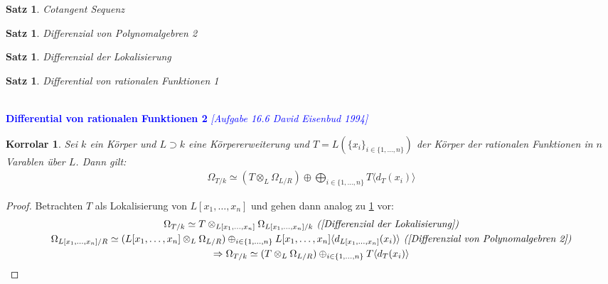 \documentclass[10pt,a4paper]{report}
\newcommand{\ModulsOfDifferenzials}{David Eisenbud 1994}
\newcounter{Aussage}[chapter]
\newtheorem{satz}[Aussage]{Satz}
\newtheorem{korrolar}[Aussage]{Korrolar}
\newcommand{\divR}[2]{\Omega_{#1/#2}}
\newcommand{\divf}[1]{d_{#1}}
\newcommand{\Tensor}[3]{#1 \otimes_{#2} #3}
\newcommand{\Verz}[1]{\langle #1 \rangle}
\begin{document}
\begin{satz}\label{Cotangent Sequenz}
Cotangent Sequenz
\end{satz}

\begin{satz}\label{Differenzial von Polynomalgebren 2}
Differenzial von Polynomalgebren 2
\end{satz}

\begin{satz}\label{Differenzial der Lokalisierung}
Differenzial der Lokalisierung
\end{satz}

\begin{satz}\label{Differential von rationalen Funktionen 1}
Differential von rationalen Funktionen 1
\end{satz}


\ \\
\textcolor{blue}{\textbf{Differential von rationalen Funktionen 2} \textit{[Aufgabe 16.6 \ModulsOfDifferenzials]}}
\begin{korrolar}\label{Differential von rationalen Funktionen 2}
Sei $k$ ein Körper und $L \supset k$ eine Körpererweiterung und $T = L(\lbrace x_i \rbrace_{i \in \lbrace 1,\dots,n \rbrace})$ der Körper der rationalen Funktionen in $n$ Varablen über $L$. Dann gilt:
\begin{gather*}
\divR{T}{k} \simeq (\Tensor{T}{L}{\divR{L}{R}}) \oplus \bigoplus_{i \in \lbrace 1,\dots,n \rbrace} T \Verz{\divf{T}(x_i)}
\end{gather*}
\end{korrolar}
\begin{proof}
Betrachten $T$ als Lokalisierung von $L[x_1,\dots,x_n]$ und gehen dann analog zu \cref{Differential von rationalen Funktionen 1} vor:
\begin{gather*}
\divR{T}{k} \simeq \Tensor{T}{L[x_1,\dots,x_n]}{\divR{L[x_1,\dots,x_n]}{k}} \textit{ (\cref{Differenzial der Lokalisierung})} \\
\divR{L[x_1,\dots,x_n]}{R} \simeq (\Tensor{L[x_1,\dots,x_n]}{L}{\divR{L}{R}}) \oplus_{i \in \lbrace 1,...,n \rbrace} L[x_1,\dots,x_n] \Verz{\divf{L[x_1,\dots,x_n]}(x_i)} \textit{ (\cref{Differenzial von Polynomalgebren 2})} \\
\Rightarrow \divR{T}{k} \simeq (\Tensor{T}{L}{\divR{L}{R}}) \oplus_{i \in \lbrace 1,\dots,n \rbrace} T \Verz{\divf{T}(x_i)}
\end{gather*}
\end{proof}
\end{document}
